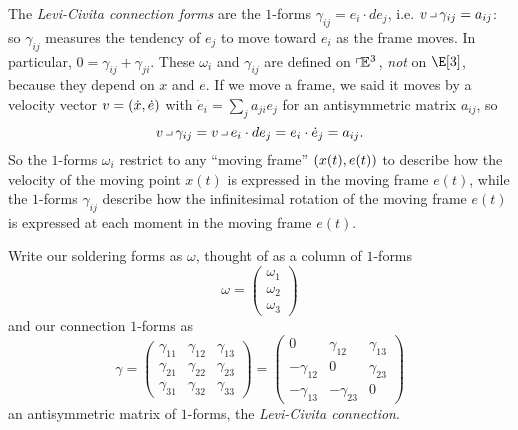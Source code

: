 The \emph{Levi-Civita connection forms} are the \(1\)-forms \(\gamma_{ij}=e_i \cdot de_j\), i.e. \(v \hook \gamma_{ij} = a_{ij}\): so \(\gamma_{ij}\) measures the tendency of \(e_j\) to move toward \(e_i\) as the frame moves.
In particular, \(0=\gamma_{ij}+\gamma_{ji}\).
These \(\omega_i\) and \(\gamma_{ij}\) are defined on \(\left\ulcorner\!\mathbb{E}^{3}\right.\), \emph{not} on \(\E[3]\), because they depend on \(x\) and \(e\).
If we move a frame, we said it moves by a velocity vector \(v=\left(\dot{x},\dot{e}\right)\) with \(\dot{e}_i = \sum_j a_{ji} e_j\) for an antisymmetric matrix \(a_{ij}\), so
\[
v \hook \gamma_{ij} = v \hook e_i \cdot de_j = e_i \cdot \dot{e}_j = a_{ij}.
\]
So the \(1\)-forms \(\omega_i\) restrict to any ``moving frame'' \(\left(x(t),e(t)\right)\) to describe how the velocity of the moving point \(x(t)\) is expressed in the moving frame \(e(t)\), while the \(1\)-forms \(\gamma_{ij}\) describe how the infinitesimal rotation of the moving frame \(e(t)\) is expressed at each moment in the moving frame \(e(t)\).

Write our soldering forms as \(\omega\), thought of as a column of \(1\)-forms
\[
\omega
=
\begin{pmatrix}
\omega_1 \\
\omega_2 \\
\omega_3
\end{pmatrix}
\]
and our connection \(1\)-forms as
\[
\gamma=
\begin{pmatrix}
\gamma_{11} & \gamma_{12} & \gamma_{13} \\
\gamma_{21} & \gamma_{22} & \gamma_{23} \\
\gamma_{31} & \gamma_{32} & \gamma_{33} 
\end{pmatrix}
=
\begin{pmatrix}
0 & \gamma_{12} & \gamma_{13} \\
-\gamma_{12} & 0 & \gamma_{23} \\
-\gamma_{13} & -\gamma_{23} & 0
\end{pmatrix}
\]
an antisymmetric matrix of \(1\)-forms, the \emph{Levi-Civita connection}.

